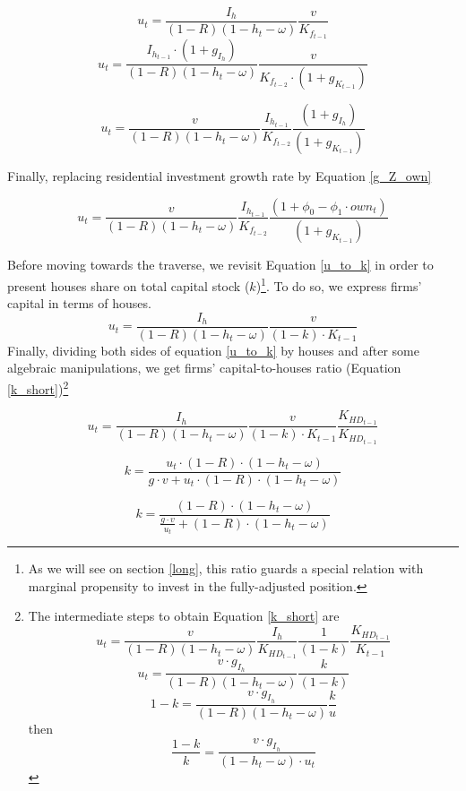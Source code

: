 \documentclass[11pt]{article}
\begin{document}
\begin{equation}
\label{u_to_k}
u_t = \frac{I_h}{(1-R)(1-h_t - \omega)}\frac{v}{K_{f_{t-1}}}
\end{equation}
$$
u_t = \frac{I_{h_{t-1}}\cdot (1 + g_{I_h})}{(1-R)(1-h_t - \omega)}\frac{v}{K_{f_{t-2}}\cdot (1+g_{K_{t-1}})}
$$

\begin{equation}
\label{short_u}
u_t = \frac{v}{(1-R)(1-h_t - \omega)}\frac{I_{h_{t-1}}}{K_{f_{t-2}}}\frac{(1 + g_{I_h})}{(1+g_{K_{t-1}})}
\end{equation}


Finally, replacing residential investment growth rate by Equation \ref{g_Z_own}


\begin{equation}
\label{short_u}
u_t = \frac{v}{(1-R)(1-h_t - \omega)}\frac{I_{h_{t-1}}}{K_{f_{t-2}}}\frac{(1 + \phi_0 - \phi_1\cdot own_t)}{(1+g_{K_{t-1}})}
\end{equation}

Before moving towards the traverse, we revisit Equation \ref{u_to_k} in order to present houses share on total capital stock (\(k\))\footnote{As we will see on section \ref{long}, this ratio guards a special relation with marginal propensity to invest in the fully-adjusted position.}.  To do so, we express firms' capital in terms of houses. 
$$
u_t = \frac{I_h}{(1-R)(1-h_t - \omega)}\frac{v}{(1-k)\cdot K_{t-1}}
$$
Finally, dividing both sides of equation \ref{u_to_k} by houses and after some algebraic manipulations, we get firms' capital-to-houses ratio (Equation \ref{k_short})\footnote{The intermediate steps to obtain Equation \ref{k_short} are
$$
u_t = \frac{v}{(1-R)(1-h_t - \omega)}\frac{I_h}{K_{HD_{t-1}}}\frac{1}{(1-k)}\frac{K_{HD_{t-1}}}{K_{t-1}}
$$
$$
u_t = \frac{v\cdot g_{I_h}}{(1-R)(1-h_t - \omega)}\frac{k}{(1-k)}
$$
$$
1-k = \frac{v\cdot g_{I_h}}{(1-R)(1-h_t - \omega)}\frac{k}{u}
$$
then
$$
\frac{1-k}{k} = \frac{v\cdot g_{I_h}}{(1 - h_t - \omega)\cdot u_{t}}
$$}

$$
u_t = \frac{I_h}{(1-R)(1-h_t - \omega)}\frac{v}{(1-k)\cdot K_{t-1}}\frac{K_{HD_{t-1}}}{K_{HD_{t-1}}}
$$

$$
k = \frac{u_t\cdot (1-R)\cdot (1-h_t - \omega)}{g\cdot v + u_t\cdot  (1-R)\cdot (1-h_t - \omega)}
$$

\begin{equation}
\label{k_short}
k = \frac{(1-R)\cdot (1-h_t - \omega)}{\frac{g\cdot v}{u_t} + (1-R)\cdot (1-h_t - \omega)}
\end{equation}
\end{document}
